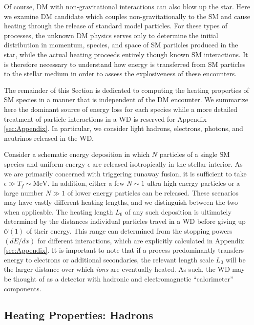 \documentclass[twocolumn, preprintnumbers,amsmath,amssymb,prd, superscriptaddress]{revtex4}
\newcommand{\OO}{\mathcal{O}}
\begin{document}
Of course, DM with non-gravitational interactions can also blow up the star. 
Here we examine DM candidate which couples non-gravitationally to the SM and cause heating through the release of standard model particles. 
For these types of processes, the unknown DM physics serves only to determine the initial distribution in momentum, species, and space of SM particles produced in the star, while the actual heating proceeds entirely though known SM interactions.
It is therefore necessary to understand how energy is transferred from SM particles to the stellar medium in order to assess the explosiveness of these encounters.

The remainder of this Section is dedicated to computing the heating properties of SM species in a manner that is independent of the DM encounter.
We summarize here the dominant source of energy loss for each species while a more detailed treatment of particle interactions in a WD is reserved for Appendix \ref{sec:Appendix}. In particular, we consider light hadrons, electrons, photons, and neutrinos released in the WD.

Consider a schematic energy deposition in which $N$ particles of a single SM species and uniform energy $\epsilon$ are released isotropically in the stellar interior.
As we are primarily concerned with triggering runaway fusion, it is sufficient to take $\epsilon \gg T_f \sim \text{MeV}$.
In addition, either a few $N \sim 1$ ultra-high energy particles or a large number $N \gg 1$ of lower energy particles can be released.
These scenarios may have vastly different heating lengths, and we distinguish between the two when applicable.
The heating length $L_0$ of any such deposition is ultimately determined by the distances individual particles travel in a WD before giving up $\OO(1)$ of their energy.
This range can determined from the stopping powers $(dE/dx)$ for different interactions, which are explicitly calculated in Appendix \ref{sec:Appendix}.
It is important to note that if a process predominantly transfers energy to electrons or additional secondaries, the relevant length scale $L_0$ will be the larger distance over which \emph{ions} are eventually heated.
As such, the WD may be thought of as a detector with hadronic and electromagnetic ``calorimeter'' components.

\subsection{Heating Properties: Hadrons}
\end{document}
